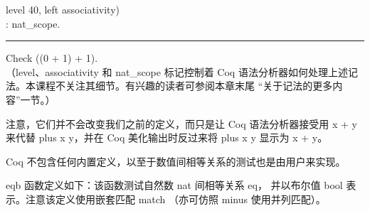 \documentclass[utf8]{ctexart}
\begin{document}
{level} 40, {left} {associativity})\\
\hspace*{0.333em}\hspace*{0.333em}\hspace*{0.333em}\hspace*{0.333em}\hspace*{0.333em}\hspace*{0.333em}\hspace*{0.333em}\hspace*{0.333em}\hspace*{0.333em}\hspace*{0.333em}\hspace*{0.333em}\hspace*{0.333em}\hspace*{0.333em}\hspace*{0.333em}\hspace*{0.333em}\hspace*{0.333em}\hspace*{0.333em}\hspace*{0.333em}\hspace*{0.333em}\hspace*{0.333em}\hspace*{0.333em}\hspace*{0.333em}\hspace*{0.333em}:
{nat\_scope}.\\

\begin{center}\rule{0.5\linewidth}{\linethickness}\end{center}

{Check} ((0 + 1) + 1).\\

（{{level}}、{{associativity}} 和 {{nat\_scope}} 标记控制着 Coq
语法分析器如何处理上述记法。本课程不关注其细节。有兴趣的读者可参阅本章末尾
``关于记法的更多内容''一节。）

注意，它们并不会改变我们之前的定义，而只是让 Coq 语法分析器接受用 {{x}}
{+} {{y}} 来代替 {{plus}} {{x}} {{y}}，并在 Coq 美化输出时反过来将
{{plus}} {{x}} {{y}} 显示为 {{x}} {+} {{y}}。

Coq 不包含任何内置定义，以至于数值间相等关系的测试也是由用户来实现。

{{eqb}} 函数定义如下：该函数测试自然数 {{nat}} 间相等关系 {{eq}}，
并以布尔值 {{bool}} 表示。注意该定义使用嵌套匹配 {{match}} （亦可仿照
{{minus}} 使用并列匹配）。
\end{document}
